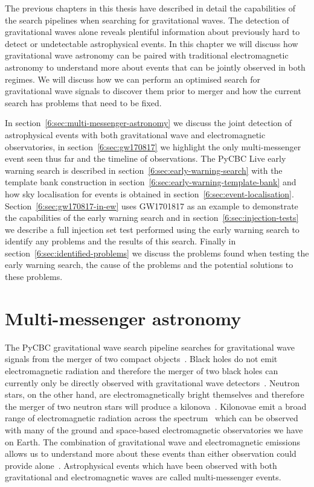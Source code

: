 The previous chapters in this thesis have described in detail the capabilities of the search pipelines when searching for gravitational waves. The detection of gravitational waves alone reveals plentiful information about previously hard to detect or undetectable astrophysical events. In this chapter we will discuss how gravitational wave astronomy can be paired with traditional electromagnetic astronomy to understand more about events that can be jointly observed in both regimes. We will discuss how we can perform an optimised search for gravitational wave signals to discover them prior to merger and how the current search has problems that need to be fixed.

In section~\ref{6:sec:multi-messenger-astronomy} we discuss the joint detection of astrophysical events with both gravitational wave and electromagnetic observatories, in section~\ref{6:sec:gw170817} we highlight the only multi-messenger event seen thus far and the timeline of observations. The PyCBC Live early warning search is described in section~\ref{6:sec:early-warning-search} with the template bank construction in section~\ref{6:sec:early-warning-template-bank} and how sky localisation for events is obtained in section~\ref{6:sec:event-localisation}. Section~\ref{6:sec:gw170817-in-ew} uses GW1701817 as an example to demonstrate the capabilities of the early warning search and in section~\ref{6:sec:injection-tests} we describe a full injection set test performed using the early warning search to identify any problems and the results of this search. Finally in section~\ref{6:sec:identified-problems} we discuss the problems found when testing the early warning search, the cause of the problems and the potential solutions to these problems.

\section{\label{6:sec:multi-messenger-astronomy}Multi-messenger astronomy}

The PyCBC gravitational wave search pipeline searches for gravitational wave signals from the merger of two compact objects~\cite{PyCBC:2016}. Black holes do not emit electromagnetic radiation and therefore the merger of two black holes can currently only be directly observed with gravitational wave detectors~\cite{Ghez:2000}. Neutron stars, on the other hand, are electromagnetically bright themselves and therefore the merger of two neutron stars will produce a kilonova~\cite{Kilonovae:2017}. Kilonovae emit a broad range of electromagnetic radiation across the spectrum~\cite{kilonova_lightcurve:2017} which can be observed with many of the ground and space-based electromagnetic observatories we have on Earth. The combination of gravitational wave and electromagnetic emissions allows us to understand more about these events than either observation could provide alone~\cite{multi_mess_astro:2019}. Astrophysical events which have been observed with both gravitational and electromagnetic waves are called multi-messenger events.

